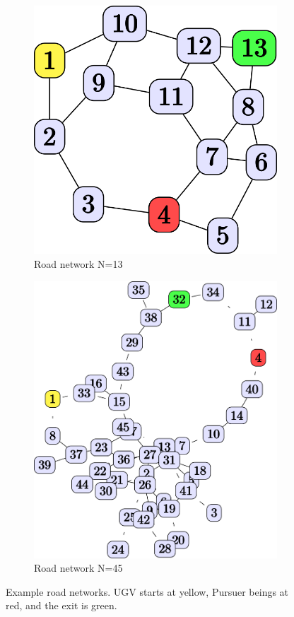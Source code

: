 \begin{figure}[tbp]
    \centering
    \begin{subfigure}[b]{0.50\linewidth}
        \centering
        \includegraphics[width=0.7\linewidth]{Figures/original_roadnet.png}
        \vfill
        \caption{Road network N=13}
        \label{fig:roadnet}
    \end{subfigure}%
    \hfill
    \begin{subfigure}[b]{0.50\linewidth}
        \centering
        \includegraphics[width=0.7\linewidth]{Figures/medium_roadnet.png}
        \caption{Road network N=45}
        \label{fig:med_roadnet}
    \end{subfigure} 
    \caption{Example road networks. UGV starts at yellow, Pursuer beings at red, and the exit is green.}
\end{figure}

